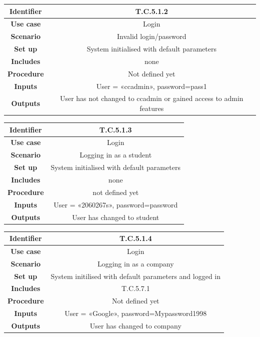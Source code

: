 \documentclass{l3deliverable}
\begin{document}
\begin{tabular}{|c|c|}
\hline \textbf{Identifier} & T.C.5.1.2 \\
\hline \textbf{Use case} & Login\\
\hline \textbf{Scenario} & Invalid login/password\\
\hline \textbf{Set up} & System initialised with default parameters\\
\hline \textbf{Includes} & none\\
\hline \textbf{Procedure} & Not defined yet\\
\hline \textbf{Inputs} & User = «ccadmin», password=pass1\\
\hline \textbf{Outputs} & User has not changed to ccadmin or gained
access to admin features \\
\hline
\end{tabular}

\begin{tabular}{|c|c|}
\hline \textbf{Identifier} & T.C.5.1.3\\
\hline \textbf{Use case} & Login \\
\hline \textbf{Scenario} & Logging in as a student\\
\hline \textbf{Set up} & System initialised with default parameters\\
\hline \textbf{Includes} & none\\
\hline \textbf{Procedure} & not defined yet\\
\hline \textbf{Inputs} & User = «2060267s», password=password\\
\hline \textbf{Outputs} & User has changed to student\\
\hline
\end{tabular}

\begin{tabular}{|c|c|}
\hline \textbf{Identifier} & T.C.5.1.4 \\
\hline \textbf{Use case} & Login \\
\hline \textbf{Scenario} & Logging in as a company\\
\hline \textbf{Set up} & System initilised with default parameters and logged in\\
\hline \textbf{Includes} & T.C.5.7.1\\
\hline \textbf{Procedure} & Not defined yet\\
\hline \textbf{Inputs} & User = «Google», password=Mypassword1998\\
\hline \textbf{Outputs} & User has changed to company\\
\hline
\end{tabular}
\end{document}
